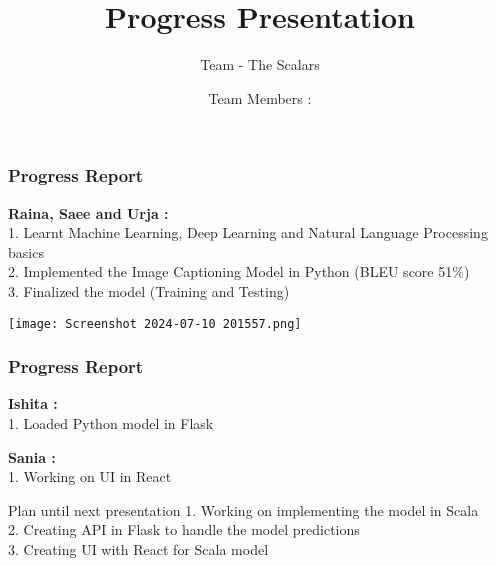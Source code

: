\documentclass{beamer}
\title[]
{Progress Presentation}
\subtitle{Team - The Scalars}
\author[] 
{Team Members :}
\institute[]
{
    Ishita Gupta\\
    Raina Dsouza\\
    Saee Bachute\\
    Sania Valiyani\\
    Urja Tendolkar\\
}
\begin{document}
\frame{\titlepage}

\begin{frame}
\frametitle{Progress Report}
\textbf{Raina, Saee and Urja : }\\
1. Learnt Machine Learning, Deep Learning and Natural Language Processing basics\\
2. Implemented the Image Captioning Model in Python (BLEU score 51\%) \\
3. Finalized the model (Training and Testing)
\end{frame}

\begin{frame}
    \centering
    \texttt{[image: Screenshot 2024-07-10 201557.png]}


\end{frame}
\begin{frame}
\frametitle{Progress Report}
\textbf{Ishita :}\\
1. Loaded Python model in Flask

\textbf{Sania :} \\
1. Working on UI in React
\end{frame}

\begin{frame}{Plan until next presentation}
1. Working on implementing the model in Scala\\
2. Creating API in Flask to handle the model predictions\\
3. Creating UI with React for Scala model\\
\end{frame}
\end{document}
